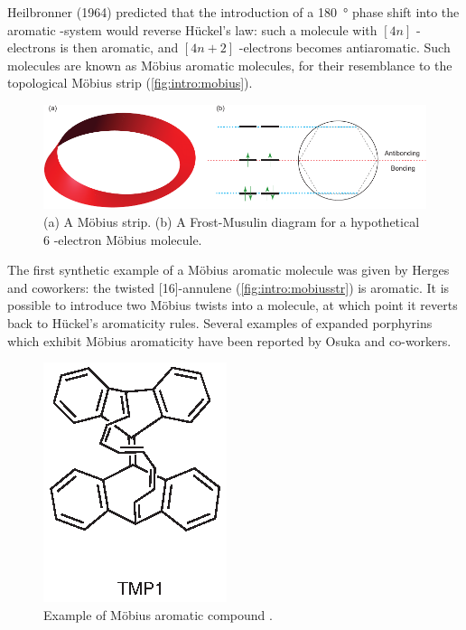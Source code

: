 			Heilbronner (1964) predicted that the introduction of a \SI{180}{\degree} phase shift into the aromatic \pii{}-system would reverse H\"uckel's law: such a molecule with $[4n]$ \pii{}-electrons is then aromatic, and $[4n+2]$ \pii{}-electrons becomes antiaromatic.\autocite{Heilbronner1964} Such molecules are known as M\"obius aromatic molecules, for their resemblance to the topological M\"obius strip (\autoref{fig:intro:mobius}).

			\begin{figure}[ht!]
				\centering\includegraphics{figures/intro/mobius.pdf} 
				\caption[]{(a) A M\"obius strip. (b) A Frost-Musulin diagram for a hypothetical 6 \pii{}-electron M\"obius molecule.}
				\label{fig:intro:mobius}
			\end{figure}

			The first synthetic example of a M\"obius aromatic molecule was given by Herges and coworkers: the twisted [16]-annulene  (\autoref{fig:intro:mobiusstr}) is aromatic.\autocite{Ajami2003} It is possible to introduce two M\"obius twists into a molecule, at which point it reverts back to H\"uckel's aromaticity rules.\autocite{Fowler2006,Rzepa2005} Several examples of expanded porphyrins which exhibit M\"obius aromaticity have been reported by Osuka and co-workers.\autocite{Yoon2009a}



			\begin{figure}[ht!]
				\centering\includegraphics{figures/intro/mobius.eps} 
				\caption[]{Example of M\"obius aromatic compound .\autocite{Ajami2003}}
				\label{fig:intro:mobiusstr}
			\end{figure}


